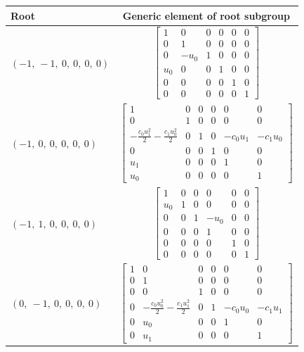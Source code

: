 \documentclass[11pt]{article}
\theoremstyle{definition}
\begin{document}
\noindent \begin{longtable}{|l|c|}
    \hline
    \textbf{Root} & \textbf{Generic element of root subgroup} \\
    \hline
    \endhead
    $\left( -1, \  -1, \  0, \  0, \  0, \  0\right)$ & ${\left[\begin{matrix}1 & 0 & 0 & 0 & 0 & 0\\0 & 1 & 0 & 0 & 0 & 0\\0 & - u_{0} & 1 & 0 & 0 & 0\\u_{0} & 0 & 0 & 1 & 0 & 0\\0 & 0 & 0 & 0 & 1 & 0\\0 & 0 & 0 & 0 & 0 & 1\end{matrix}\right]}$ \\
    \hline
    $\left( -1, \  0, \  0, \  0, \  0, \  0\right)$ & ${\left[\begin{matrix}1 & 0 & 0 & 0 & 0 & 0\\0 & 1 & 0 & 0 & 0 & 0\\- \frac{c_{0} u_{1}^{2}}{2} - \frac{c_{1} u_{0}^{2}}{2} & 0 & 1 & 0 & - c_{0} u_{1} & - c_{1} u_{0}\\0 & 0 & 0 & 1 & 0 & 0\\u_{1} & 0 & 0 & 0 & 1 & 0\\u_{0} & 0 & 0 & 0 & 0 & 1\end{matrix}\right]}$ \\
    \hline
    $\left( -1, \  1, \  0, \  0, \  0, \  0\right)$ & ${\left[\begin{matrix}1 & 0 & 0 & 0 & 0 & 0\\u_{0} & 1 & 0 & 0 & 0 & 0\\0 & 0 & 1 & - u_{0} & 0 & 0\\0 & 0 & 0 & 1 & 0 & 0\\0 & 0 & 0 & 0 & 1 & 0\\0 & 0 & 0 & 0 & 0 & 1\end{matrix}\right]}$ \\
    \hline
    $\left( 0, \  -1, \  0, \  0, \  0, \  0\right)$ & ${\left[\begin{matrix}1 & 0 & 0 & 0 & 0 & 0\\0 & 1 & 0 & 0 & 0 & 0\\0 & 0 & 1 & 0 & 0 & 0\\0 & - \frac{c_{0} u_{0}^{2}}{2} - \frac{c_{1} u_{1}^{2}}{2} & 0 & 1 & - c_{0} u_{0} & - c_{1} u_{1}\\0 & u_{0} & 0 & 0 & 1 & 0\\0 & u_{1} & 0 & 0 & 0 & 1\end{matrix}\right]}$ \\

\end{longtable}
\end{document}
